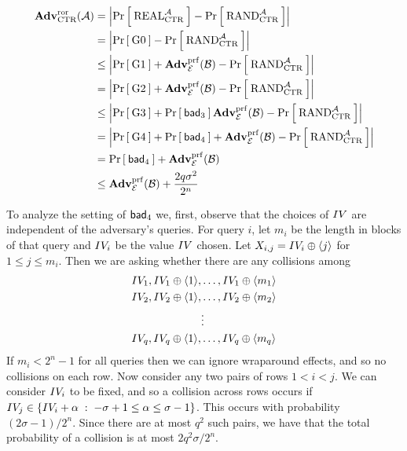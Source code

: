 \begin{align*}
  \mathbf{Adv}^{\mathrm{ror}}_{\textnormal{CTR}}({\mathcal A}) 
    &= \left| \Pr\left[\: \textnormal{REAL}_{\textnormal{CTR}}^{\mathcal A} \:\right] - \Pr\left[\: \textnormal{RAND}_{\textnormal{CTR}}^{\mathcal A} \:\right]\right|\\
    &= \left| \Pr\left[\: {{\textnormal G}}0 \:\right] - \Pr\left[\: \textnormal{RAND}_{\textnormal{CTR}}^{\mathcal A} \:\right]\right|\\
    &\le \left| \Pr\left[\: {{\textnormal G}}1 \:\right] + \mathbf{Adv}^{\mathrm{prf}}_{{\cal E}}({\mathcal B}) - \Pr\left[\: \textnormal{RAND}_{\textnormal{CTR}}^{\mathcal A} \:\right]\right|\\
    &= \left| \Pr\left[\: {{\textnormal G}}2 \:\right] + \mathbf{Adv}^{\mathrm{prf}}_{{\cal E}}({\mathcal B}) - \Pr\left[\: \textnormal{RAND}_{\textnormal{CTR}}^{\mathcal A} \:\right]\right|\\
    &\le \left| \Pr\left[\: {{\textnormal G}}3 \:\right] + \Pr\left[\: \mathsf{bad}_3 \:\right] \mathbf{Adv}^{\mathrm{prf}}_{{\cal E}}({\mathcal B}) - \Pr\left[\: \textnormal{RAND}_{\textnormal{CTR}}^{\mathcal A} \:\right]\right|\\
    &= \left| \Pr\left[\: {{\textnormal G}}4 \:\right] + \Pr\left[\: \mathsf{bad}_4 \:\right] + \mathbf{Adv}^{\mathrm{prf}}_{{\cal E}}({\mathcal B}) - \Pr\left[\: \textnormal{RAND}_{\textnormal{CTR}}^{\mathcal A} \:\right]\right|\\
    &= \Pr\left[\: \mathsf{bad}_4 \:\right] + \mathbf{Adv}^{\mathrm{prf}}_{{\cal E}}({\mathcal B})\\
    &\le \mathbf{Adv}^{\mathrm{prf}}_{{\cal E}}({\mathcal B}) + \frac{2q\sigma^2}{2^n}
\end{align*}

To analyze the setting of $\mathsf{bad}_4$ we, first, observe that the choices of $IV$
are independent of the adversary's queries. For query $i$, let $m_i$ be the
length in blocks of that query and $IV_i$ be the value $IV$ chosen.
Let $X_{i,j} = IV_i \oplus \langle j\rangle$ for $1 \le j \le m_i$. Then we are
asking whether there are any collisions among 
\begin{align*}
    &\IV_1 , \IV_1 \oplus \langle 1\rangle, \ldots , \IV_1 \oplus \langle m_1\rangle \\
    &\IV_2 , \IV_2 \oplus \langle 1\rangle, \ldots , \IV_2 \oplus \langle m_2\rangle \\
    &\phantom{\IV_2 , \IV_2 \oplus \langle 1\rangle, } \vdots\\
    &\IV_q , \IV_q \oplus \langle 1\rangle, \ldots , \IV_q \oplus \langle m_q\rangle \\
\end{align*}
If $m_i < 2^n-1$ for all queries then we can ignore wraparound effects, and so
no collisions on each row. Now consider any two pairs of rows $1 < i < j$. We
can consider $IV_i$ to be fixed, and so a collision across rows occurs if
$IV_j \in \{IV_i + \alpha \;:\; -\sigma +1 \le \alpha \le \sigma-1\}$. This
occurs with probability $(2\sigma-1) / 2^n$. Since there are at most $q^2$ such
pairs, we have that the total probability of a collision is at most 
$2q^2\sigma / 2^n$.


